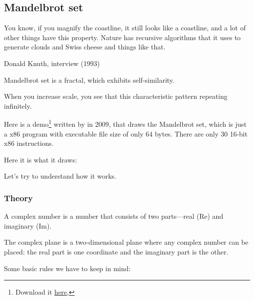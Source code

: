 ﻿\clearpage
\subsection{Mandelbrot set}
\label{Mandelbrot_demo}

\epigraph{You know, if you magnify the coastline, it still looks like
a coastline, and a lot of other things have this property. Nature has
recursive algorithms that it uses to generate clouds and Swiss cheese
and things like that.}
{Donald Knuth, interview (1993)}

Mandelbrot set is a fractal, which exhibits self-similarity.

When you increase scale, you see that this characteristic pattern repeating infinitely.

Here is a demo\footnote{Download it \href{http://go.yurichev.com/17306} {here},} 
written by  in 2009, that draws 
the Mandelbrot set, which is just a x86 program with executable file size of only 64 bytes.
There are only 30 16-bit x86 instructions.

Here it is what it draws:

\begin{figure}[H]
\centering
{}
\end{figure}

Let's try to understand how it works.

\subsubsection{Theory}


A complex number is a number that consists of two parts---real (Re) and imaginary (Im).


The complex plane is a two-dimensional plane where any complex number can be placed: the real part is one coordinate
and the imaginary part is the other.

Some basic rules we have to keep in mind:

